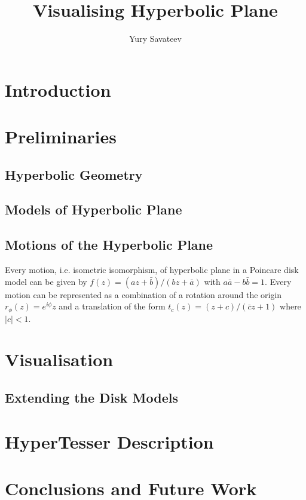 \documentclass{llncs}
\title{Visualising Hyperbolic Plane}
\author{Yury Savateev}
\institute{University of Hertfordshire}
\begin{document}
\maketitle



\section{Introduction}
\section{Preliminaries}
\subsection{Hyperbolic Geometry}
\subsection{Models of Hyperbolic Plane}
\subsection{Motions of the Hyperbolic Plane}
Every motion, i.e. isometric isomorphism, of hyperbolic plane in a Poincare disk model can be given by $f(z) = (az + \bar b)/(bz + \bar a)$ with $a\bar a-b\bar b=1$. Every motion can be represented as a combination of a rotation around the origin $r_\phi(z)=e^{i\phi}z$ and a translation of the form $t_c(z)=(z+c)/(\bar c z+1)$ where $|c|<1$.
\section{Visualisation}
\subsection{Extending the Disk Models}
\section{HyperTesser Description}
\section{Conclusions and Future Work}







\end{document}
